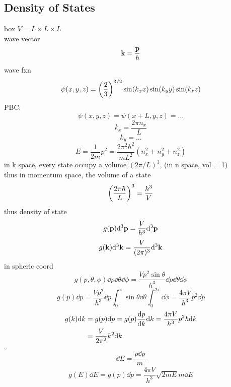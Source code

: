 \documentclass[UTF8]{ctexart} %
\DeclareMathOperator{\ti}{\times}
\numberwithin{equation}{subsection}
\begin{document}
\subsection{Density of States}
box $V = L\ti L\ti L$\\
wave vector
\begin{equation}\label{key}
\vb{k} = \dfrac{\vb{p}}{\hbar}
\end{equation}
wave fxn
\begin{equation}\label{key}
\psi(x,y,z) = \qty(\dfrac{2}{3})^{3/2} \sin(k_x x)\sin(k_y y)\sin(k_z z)
\end{equation}
PBC:
\begin{equation}\label{key}
\psi(x,y,z) = \psi(x+L, y, z) = ...
\end{equation}
\begin{equation}\label{key}
k_x = \dfrac{2\pi n_x}{L}
\end{equation}
\begin{equation}\label{key}
k_y = ...
\end{equation}
\begin{equation}\label{key}
E = \dfrac{1}{2m}p^2 = \dfrac{2\pi^2\hbar^2}{mL^2}(n_x^2 + n_y^2 + n_z^2)
\end{equation}
in k space, every state occupy a volume $(2\pi/L)^3$, (in n space, vol = 1)\\
thus in momentum space, the volume of a state 
\begin{equation}\label{key}
\qty(\dfrac{2\pi\hbar}{L})^3 = \dfrac{h^3}{V}
\end{equation}
thus density of state
\begin{equation}\label{key}
g(\vb{p})\dd[3]\vb{p} = \dfrac{V}{h^3}\dd[3]\vb{p}
\end{equation}
\begin{equation}\label{key}
g(\vb{k})\dd[3]\vb{k} = \dfrac{V}{(2\pi)^3}\dd[3]\vb{k}
\end{equation}
in spheric coord
\begin{equation}\label{key}
g(p,\theta,\phi)\dd p\dd\theta\dd\phi = \dfrac{Vp^2\sin\theta}{h^3}\dd p\dd\theta\dd\phi
\end{equation}
\begin{equation}\label{key}
g(p)\dd p = \dfrac{Vp^2}{h^3}\dd p\int_0^\pi\sin\theta\dd\theta\int_0^{2\pi}\dd\phi = \dfrac{4\pi V}{h^3}p^2\dd p
\end{equation}
\begin{equation}\label{key}
\begin{aligned}
g(k)\dd k &= g(p)\dd p = g(p)\dv{p}{k}\dd k = \dfrac{4\pi V}{h^3}p^2 \hbar\dd k\\
&= \dfrac{V}{2\pi^2}k^2\dd k
\end{aligned}
\end{equation}
$\because$
\begin{equation}\label{key}
\dd E = \dfrac{p\dd p}{m}
\end{equation}
\begin{equation}\label{key}
\begin{aligned}
g(E)\dd E = g(p)\dd p = \dfrac{4\pi V}{h^3}\sqrt{2mE} m\dd E
\end{aligned}
\end{equation}
\end{document}
